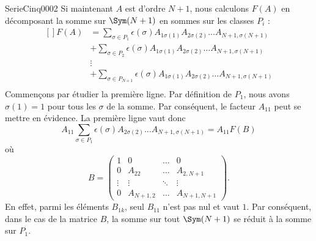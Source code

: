 \begin{corrige}{SerieCinq0002}
Si maintenant $A$ est d'ordre $N+1$, nous calculons $F(A)$ en décomposant la somme sur $\Sym(N+1)$ en sommes sur les classes $P_i$ :
\begin{equation}		\label{EqCDsommeSymFA}
	\begin{aligned}[]
		F(A)&=\sum_{\sigma\in P_1}\epsilon(\sigma)A_{1\sigma(1)}A_{2\sigma(2)}\ldots A_{N+1,\sigma(N+1)}\\
			&+\sum_{\sigma\in P_2}\epsilon(\sigma)A_{1\sigma(1)}A_{2\sigma(2)}\ldots A_{N+1,\sigma(N+1)}\\
			&\vdots\\
			&+\sum_{\sigma\in P_{N+1}}\epsilon(\sigma)A_{1\sigma(1)}A_{2\sigma(2)}\ldots A_{N+1,\sigma(N+1)}\\
	\end{aligned}
\end{equation}
Commençons par étudier la première ligne. Par définition de $P_1$, nous avons $\sigma(1)=1$ pour tous les $\sigma$ de la somme. Par conséquent, le facteur $A_{11}$ peut se mettre en évidence. La première ligne vaut donc
\begin{equation}	\label{EqCDPremierParq}
	A_{11}\sum_{\sigma\in P_1}\epsilon(\sigma)A_{2\sigma(2)}\ldots A_{N+1,\sigma(N+1)}
	=A_{11}F(B)
\end{equation}
où
\begin{equation}
	B=\begin{pmatrix}
		 1	&	0	&	\ldots	&	0	\\
		 0	&	A_{22}	&	\ldots	&	A_{2,N+1}	\\
		 \vdots	&	\vdots	&	\ddots	&	\vdots	\\ 
		 0	&	A_{N+1,2}	&	\ldots	&	A_{N+1,N+1}	 
	 \end{pmatrix}.
\end{equation}
En effet, parmi les éléments $B_{1k}$, seul $B_{11}$ n'est pas nul et vaut $1$. Par conséquent, dans le cas de la matrice $B$, la somme sur tout $\Sym(N+1)$ se réduit à la somme sur $P_1$.


\end{corrige}
